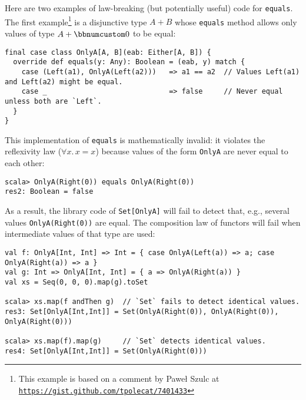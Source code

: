Here are two examples of law-breaking (but potentially useful) code
for \lstinline!equals!. The first example\footnote{This example is based on a comment by Pawe\l{}
Szulc at \texttt{\href{https://gist.github.com/tpolecat/7401433}{https://gist.github.com/tpolecat/7401433}}} is a disjunctive type $A+B$ whose \lstinline!equals! method allows
only values of type $A+\bbnum 0$ to be equal:
\begin{lstlisting}
final case class OnlyA[A, B](eab: Either[A, B]) {
  override def equals(y: Any): Boolean = (eab, y) match {
    case (Left(a1), OnlyA(Left(a2)))   => a1 == a2  // Values Left(a1) and Left(a2) might be equal.
    case _                             => false     // Never equal unless both are `Left`.
  }
}
\end{lstlisting}
This implementation of \lstinline!equals! is mathematically invalid:
it violates the reflexivity law ($\forall x.\,x=x$) because values
of the form \lstinline!OnlyA! are never equal to each other:
\begin{lstlisting}
scala> OnlyA(Right(0)) equals OnlyA(Right(0))
res2: Boolean = false
\end{lstlisting}
As a result, the library code of \lstinline!Set[OnlyA]! will fail
to detect that, e.g., several values \lstinline!OnlyA(Right(0))!
are equal. The composition law of functors will fail when intermediate
values of that type are used:
\begin{lstlisting}
val f: OnlyA[Int, Int] => Int = { case OnlyA(Left(a)) => a; case OnlyA(Right(a)) => a }
val g: Int => OnlyA[Int, Int] = { a => OnlyA(Right(a)) }
val xs = Seq(0, 0, 0).map(g).toSet

scala> xs.map(f andThen g)  // `Set` fails to detect identical values.
res3: Set[OnlyA[Int,Int]] = Set(OnlyA(Right(0)), OnlyA(Right(0)), OnlyA(Right(0)))

scala> xs.map(f).map(g)     // `Set` detects identical values.
res4: Set[OnlyA[Int,Int]] = Set(OnlyA(Right(0)))
\end{lstlisting}

